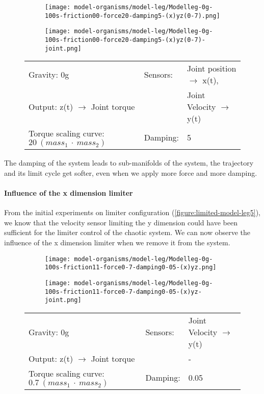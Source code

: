 \documentclass[main]{subfiles}
\begin{document}
\begin{figure}[H]
	\centering
		\begin{subfigure}[c]{0.45\textwidth}
	\texttt{[image: model-organisms/model-leg/Modelleg-0g-100s-friction00-force20-damping5-(x)yz(0-7).png]}
		\end{subfigure}
	\begin{subfigure}[c]{0.45\textwidth}
	\texttt{[image: model-organisms/model-leg/Modelleg-0g-100s-friction00-force20-damping5-(x)yz(0-7)-joint.png]}
		\end{subfigure}
	\caption[Limited chaotic controller controlling model leg]{}
	\begin{tabular}{l|ll}
	\hline 
	Gravity: 0g  & Sensors: & Joint position \(\rightarrow\) x(t),\\
	 Output: z(t) \(\rightarrow\) Joint torque &  & Joint Velocity \(\rightarrow\) y(t) \\
	  Torque scaling curve: \(20~(mass_1~\cdot~mass_2)\) & Damping: & 5 \\
	  \hline
	\end{tabular}

	\label{figure:limited-damped-model-leg-damping4}
\end{figure}

The damping of the system leads to sub-manifolds of the system, the trajectory and its limit cycle get softer, even when we apply more force and more damping.

\paragraph{Influence of the x dimension limiter} From the initial experiments on limiter configuration (\ref{figure:limited-model-leg5}), we know that the velocity sensor limiting the y dimension could have been sufficient for the limiter control of the chaotic system. %
%
We can now observe the influence of the x dimension limiter when we remove it from the system.

\begin{figure}[H]
	\centering
		\begin{subfigure}[c]{0.45\textwidth}
	\texttt{[image: model-organisms/model-leg/Modelleg-0g-100s-friction11-force0-7-damping0-05-(x)yz.png]}
		\end{subfigure}
	\begin{subfigure}[c]{0.45\textwidth}
	\texttt{[image: model-organisms/model-leg/Modelleg-0g-100s-friction11-force0-7-damping0-05-(x)yz-joint.png]}
		\end{subfigure}
	\caption[Limited chaotic controller controlling model leg]{}
	\begin{tabular}{l|ll}
	\hline 
	Gravity: 0g  & Sensors: & Joint Velocity \(\rightarrow\) y(t)\\
	 Output: z(t) \(\rightarrow\) Joint torque & & - \\
	  Torque scaling curve: \(0.7~(mass_1~\cdot~mass_2)\) & Damping: & 0.05 \\
	  \hline
	\end{tabular}

	\label{figure:limited-damped-model-leg4}
\end{figure}
\end{document}
